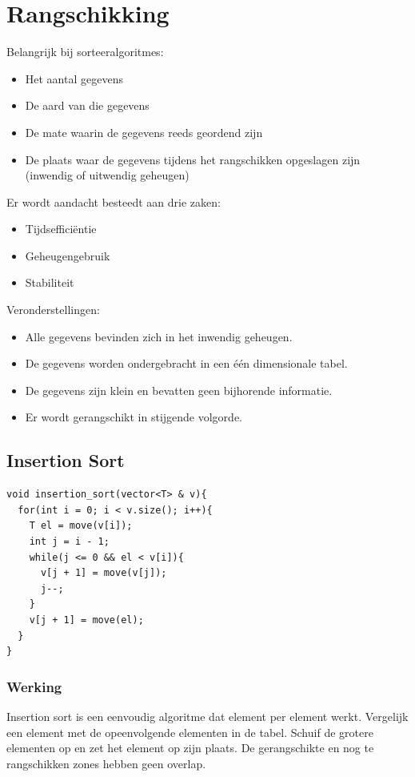 \documentclass[12pt]{report}
\begin{document}
\chapter{Rangschikking}
Belangrijk bij sorteeralgoritmes:
\begin{itemize}
 \item Het aantal gegevens
 \item De aard van die gegevens
 \item De mate waarin de gegevens reeds geordend zijn
 \item De plaats waar de gegevens tijdens het rangschikken opgeslagen zijn (inwendig of uitwendig geheugen)
\end{itemize}

Er wordt aandacht besteedt aan drie zaken:
\begin{itemize}
 \item Tijdsefficiëntie
 \item Geheugengebruik
 \item Stabiliteit
\end{itemize}

Veronderstellingen:
\begin{itemize}
 \item Alle gegevens bevinden zich in het inwendig geheugen.
 \item De gegevens worden ondergebracht in een één dimensionale tabel.
 \item De gegevens zijn klein en bevatten geen bijhorende informatie.
 \item Er wordt gerangschikt in stijgende volgorde.
\end{itemize}

\section{Insertion Sort}
\begin{lstlisting}
void insertion_sort(vector<T> & v){
  for(int i = 0; i < v.size(); i++){
    T el = move(v[i]);
    int j = i - 1;
    while(j <= 0 && el < v[i]){
      v[j + 1] = move(v[j]);
      j--;
    }
    v[j + 1] = move(el);
  }
}
\end{lstlisting}
\subsection{Werking}
Insertion sort is een eenvoudig algoritme dat element per element werkt.
Vergelijk een element met de opeenvolgende elementen in de tabel. Schuif de grotere elementen op en zet het element op zijn plaats. De gerangschikte en nog te rangschikken zones hebben geen overlap.
\end{document}
